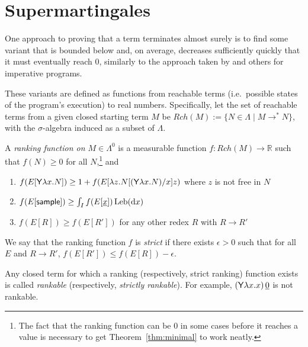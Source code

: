 \section{Supermartingales}
\label{sec:supermartingales}

One approach to proving that a term terminates almost surely is to find some variant that is bounded below and, on average, decreases sufficiently quickly that it must eventually reach 0, similarly to the approach taken by 
\cite{DBLP:conf/popl/FioritiH15} and others for imperative programs.

These variants are defined as functions from reachable terms (i.e.~possible states of the program's execution) to real numbers. Specifically, let the set of reachable terms from a given closed starting term $M$ be $Rch(M) := \{N \in \Lambda \mid M \to^* N \}$, with the $\sigma$-algebra induced as a subset of $\Lambda$.

\begin{definition}\rm
\label{def:ranking function}
A \emph{ranking function on $M \in \Lambda^0$} is a measurable function $f:\mathit{Rch}(M) \to \mathbb{R}$ such that $f(N) \geq 0$ for all $N$,\footnote{The fact that the ranking function can be 0 in some cases before it reaches a value is necessary to get Theorem~\ref{thm:minimal} to work neatly.} and
\begin{enumerate}
    \item $f(E[\mathsf{Y} \lambda x. N]) \geq 1+ f(E[\lambda z. N[(\mathsf{Y} \lambda x. N)/x] z)$ where $z$ is not free in $N$
    \item $f(E[\mathsf{sample}]) \geq \int_I f(E[\underline{x}]) \, \mathrm{Leb}(\mathrm{d}x)$
    \item $f(E[R]) \geq f(E[R'])$ for any other redex $R$ with $R \to R'$
\end{enumerate}
\iffalse
\lo{@Andrew: As defined, ranking function $f$ is not required to satisfy: $f(N) = 0$ iff $N$ is a value. But for AST analysis, we always require $f$ to satisfy this property. It seems cleaner to include this in the definition.} 
\akr{The fact that the ranking function can be 0 in some cases before it reaches a value is necessary to get Theorem~\ref{thm:minimal} to work neatly.}
\lo{OK. Let's leave Definition~\ref{def:ranking function} as it is.}
\fi
We say that the ranking function $f$ is \emph{strict} if there exists $\epsilon > 0$ such that for all $E$ and $R \to R'$, $f(E[R']) \leq f(E[R]) - \epsilon$.

Any closed term for which a ranking (respectively, strict ranking) function exists is called \emph{rankable} (respectively, \emph{strictly rankable}). 
For example, $(\mathsf{Y} \lambda x.x) \, \underline 0$ is not rankable.
\end{definition}

